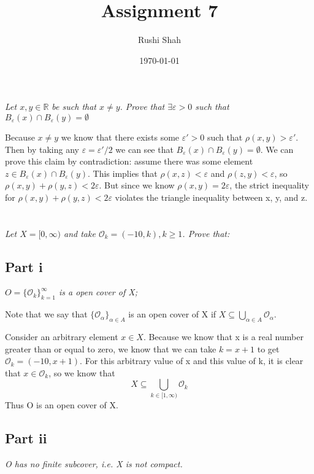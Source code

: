 \documentclass[]{article}
\author{Rushi Shah}
\date{\today}
\title{Assignment 7}
\newcommand{\reals}{\mathbb{R}}
\begin{document}
	\maketitle

	\section{}
		\textit{Let $x, y \in \reals$ be such that $x \neq y$. Prove that $\exists \varepsilon > 0$ such that $B_{\varepsilon}(x) \cap B_{\varepsilon}(y) = \emptyset$}

		Because $x \neq y$ we know that there exists some $\varepsilon' > 0$ such that $\rho(x, y) > \varepsilon'$. Then by taking any $\varepsilon = \varepsilon' / 2$ we can see that $B_{\varepsilon}(x) \cap B_{\varepsilon}(y) = \emptyset$. We can prove this claim by contradiction: assume there was some element $z \in B_{\varepsilon}(x) \cap B_{\varepsilon}(y)$. This implies that $\rho(x, z) < \varepsilon$ and $\rho(z, y) < \varepsilon$, so $\rho(x, y) + \rho(y, z) < 2 \varepsilon$. But since we know $\rho(x,y) = 2 \varepsilon$, the strict inequality for $\rho(x, y) + \rho(y, z) < 2 \varepsilon$ violates the triangle inequality between x, y, and z. 

	\section{}
		\textit{Let $X = [0, \infty)$ and take $\mathcal{O}_k = (-10, k), k \geq 1$. Prove that:}

		\subsection*{Part i}
			\textit{$O = \{\mathcal{O}_k\}_{k = 1}^\infty$ is a open cover of X;}

			Note that we say that $\{\mathcal{O}_\alpha\}_{\alpha \in A}$ is an open cover of X if $X \subseteq \bigcup_{\alpha \in A}\mathcal{O}_\alpha$. 

			Consider an arbitrary element $x \in X$. Because we know that x is a real number greater than or equal to zero, we know that we can take $k = x + 1$ to get $\mathcal{O}_k = (-10, x + 1)$. For this arbitrary value of x and this value of k, it is clear that $x \in \mathcal{O}_k$, so we know that \[X \subseteq \bigcup_{k \in [1, \infty)} \mathcal{O}_{k}\]
			Thus O is an open cover of X. 

		\subsection*{Part ii}
			\textit{O has no finite subcover, i.e. X is not compact.}
\end{document}
